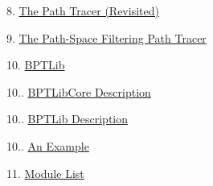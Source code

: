 \begin{DoxyItemize}
\begin{DoxyItemize}
\end{DoxyItemize}
\item 8. \hyperlink{_p_t_page}{The Path Tracer (Revisited)} 
\item 9. \hyperlink{_p_s_f_p_t_page}{The Path-\/\+Space Filtering Path Tracer} 
\item 10. \hyperlink{_b_p_t_lib_page}{B\+P\+T\+Lib} 
\begin{DoxyItemize}
\item 10.. \hyperlink{_b_p_t_lib_page_BPTLibCoreSection}{B\+P\+T\+Lib\+Core Description} 
\item 10.. \hyperlink{_b_p_t_lib_page_BPTLibSection}{B\+P\+T\+Lib Description} 
\item 10.. \hyperlink{_b_p_t_lib_page_BPTExampleSection}{An Example} 
\end{DoxyItemize}
\item 11. \hyperlink{_modules_page}{Module List} 
\end{DoxyItemize}